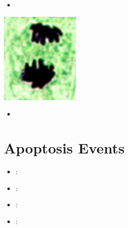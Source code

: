 \begin{itemize}
\begin{center}
  \end{center}
  \begin{itemize}
    \item 
  \end{itemize}
  \begin{center}
    \includegraphics[scale=0.5]{images/week-1-mp5.png}
  \end{center}
  \begin{itemize}
    \item 
  \end{itemize}
\end{itemize}
  
\section{Apoptosis Events}\label{Apoptosis Events}
\begin{itemize}
  \item {}:
  \item {}:
  \item {}:
  \item {}:
\end{itemize}

